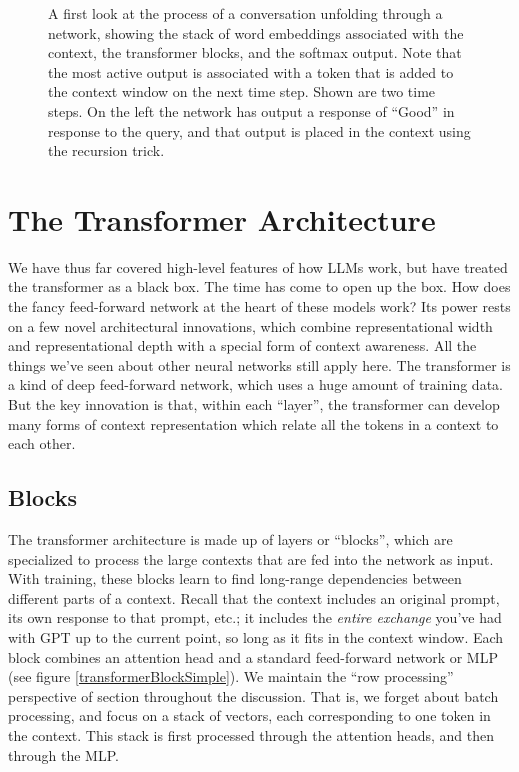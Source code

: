 \begin{figure}[ht]
\caption[Jeff Yoshimi]{A first look at the process of a conversation unfolding
through a network, showing the stack of word embeddings associated with the
context, the transformer blocks, and the softmax output. Note that the
most active output is associated with a token that is added to the context
window on the next time step. Shown are two time steps. On the left the network
has output a response of ``Good'' in response to the query, and that output is
placed in the context using the recursion trick.
}
\label{transformerOverview}
\end{figure}

\section{The Transformer Architecture}\label{transformers}

 
We have thus far covered high-level features of how LLMs work, but have treated
the transformer as a black box. The time has come to open up the box. How does
the fancy feed-forward network at the heart of these models work? Its power
rests on a few novel architectural innovations, which combine representational
width and representational depth with a special form of context awareness. All
the things we've seen about other neural networks still apply here. The
transformer is a kind of deep feed-forward network, which uses a huge amount of
training data. But the key innovation is that, within each ``layer'', the
transformer can develop many forms of context representation which relate all
the tokens in a context to each other.

\subsection{Blocks}

The transformer architecture \cite{vaswani2017attention} is made up of layers
or ``blocks'', which are specialized to process the large contexts that are fed
into the network as input. With training, these blocks learn to find long-range
dependencies between different parts of a context. Recall that the context
includes an original prompt, its own response to that prompt, etc.; it includes
the \emph{entire exchange} you've had with GPT up to the current point, so long
as it fits in the context window. Each block combines an attention head and a
standard feed-forward network or MLP (see figure \ref{transformerBlockSimple}).
We maintain the ``row processing'' perspective of section
 throughout the discussion. That is, we forget
about batch processing, and focus on a stack of vectors, each corresponding to
one token in the context. This stack is first processed through the attention
heads, and then through the MLP.

